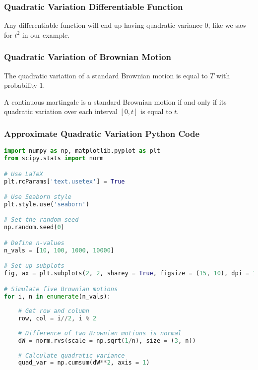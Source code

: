 \documentclass{beamer}
\begin{document}
\begin{frame}
\frametitle{Quadratic Variation Differentiable Function}
Any differentiable function will end up having quadratic variance 0, like we saw for $t^2$ in our example. 
\end{frame}

\begin{frame}
\frametitle{Quadratic Variation of Brownian Motion}

\begin{Theorem}
The quadratic variation of a standard Brownian motion is equal to $T$ with probability 1.
\end{Theorem}

\begin{Theorem}
 A continuous martingale is a standard Brownian motion if and only if its quadratic variation over each interval $[0, t]$ is equal to $t$.
\end{Theorem}

\end{frame}

\begin{frame}[fragile]
\frametitle{Approximate Quadratic Variation Python Code}

\begin{lstlisting}[language=Python]
import numpy as np, matplotlib.pyplot as plt
from scipy.stats import norm

# Use LaTeX
plt.rcParams['text.usetex'] = True

# Use Seaborn style
plt.style.use('seaborn')

# Set the random seed
np.random.seed(0)

# Define n-values
n_vals = [10, 100, 1000, 10000]

# Set up subplots
fig, ax = plt.subplots(2, 2, sharey = True, figsize = (15, 10), dpi = 125)

# Simulate five Brownian motions
for i, n in enumerate(n_vals):
    
    # Get row and column
    row, col = i//2, i % 2
    
    # Difference of two Brownian motions is normal
    dW = norm.rvs(scale = np.sqrt(1/n), size = (3, n))
    
    # Calculate quadratic variance
    quad_var = np.cumsum(dW**2, axis = 1)

\end{lstlisting}
\end{frame}
\end{document}

